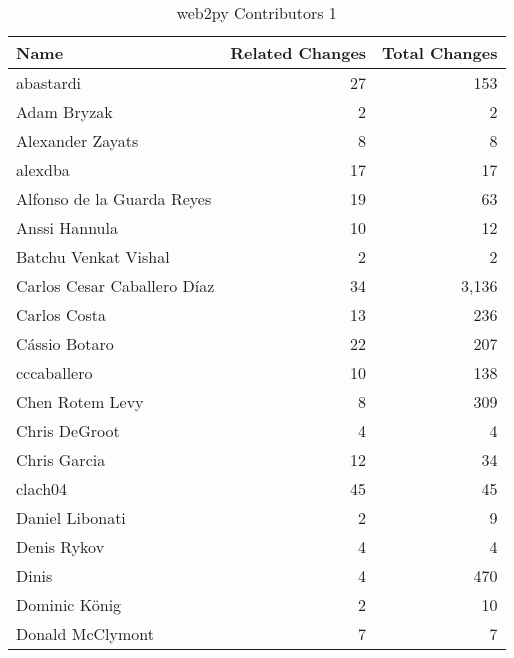 \documentclass[a4paper,man,natbib,floatsintext]{apa6}
\begin{document}
\begin{table}[ht]
\caption{web2py Contributors 1}
\label{tab:contribs-3-1}
\begin{tabular}{|l|r|r|}
\hline
Name                           & Related Changes & Total Changes \\ \hline
abastardi                      & 27              & 153           \\ \hline
Adam Bryzak                    & 2               & 2             \\ \hline
Alexander Zayats               & 8               & 8             \\ \hline
alexdba                        & 17              & 17            \\ \hline
Alfonso de la Guarda Reyes     & 19              & 63            \\ \hline
Anssi Hannula                  & 10              & 12            \\ \hline
Batchu Venkat Vishal           & 2               & 2             \\ \hline
Carlos Cesar Caballero Díaz    & 34              & 3,136         \\ \hline
Carlos Costa                   & 13              & 236           \\ \hline
Cássio Botaro                  & 22              & 207           \\ \hline
cccaballero                    & 10              & 138           \\ \hline
Chen Rotem Levy                & 8               & 309           \\ \hline
Chris DeGroot                  & 4               & 4             \\ \hline
Chris Garcia                   & 12              & 34            \\ \hline
clach04                        & 45              & 45            \\ \hline
Daniel Libonati                & 2               & 9             \\ \hline
Denis Rykov                    & 4               & 4             \\ \hline
Dinis                          & 4               & 470           \\ \hline
Dominic König                  & 2               & 10            \\ \hline
Donald McClymont               & 7               & 7             \\ \hline

\end{tabular}
\end{table}
\end{document}

